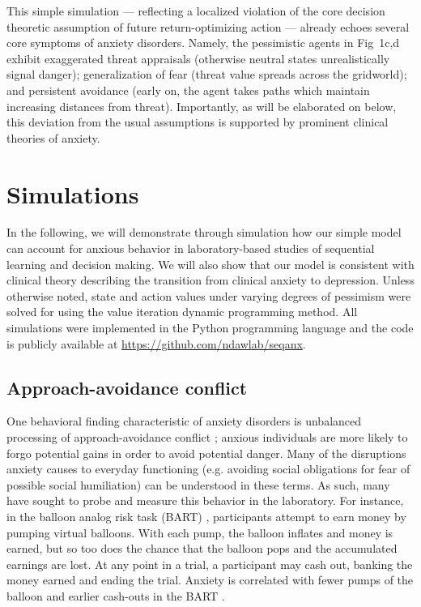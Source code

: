 \documentclass[11pt]{article} %
\begin{document}
This simple simulation --- reflecting a localized violation of the core decision theoretic assumption of future return-optimizing action --- already echoes several core symptoms of anxiety disorders. Namely, the pessimistic agents in Fig~1c,d exhibit exaggerated threat appraisals (otherwise neutral states unrealistically signal danger); generalization of fear (threat value spreads across the gridworld); and persistent avoidance (early on, the agent takes paths which maintain increasing distances from threat). Importantly, as will be elaborated on below, this deviation from the usual assumptions is supported by prominent clinical theories of anxiety.

\section{Simulations}

In the following, we will demonstrate through simulation how our simple model can account for anxious behavior in laboratory-based studies of sequential learning and decision making. We will also show that our model is consistent with clinical theory describing the transition from clinical anxiety to depression. Unless otherwise noted, state and action values under varying degrees of pessimism were solved for using the value iteration dynamic programming method\citep{SuttonBarto2018}. All simulations were implemented in the Python programming language and the code is publicly available at \url{https://github.com/ndawlab/seqanx}. 

\subsection{Approach-avoidance conflict}

One behavioral finding characteristic of anxiety disorders is unbalanced processing of approach-avoidance conflict \citep{aupperle2010}; anxious individuals are more likely to forgo potential gains in order to avoid potential danger. Many of the disruptions anxiety causes to everyday functioning (e.g. avoiding social obligations for fear of possible social humiliation) can be understood in these terms. As such, many have sought to probe and measure this behavior in the laboratory. For instance, in the balloon analog risk task (BART) \citep{Lejuez2002}, participants attempt to earn money by pumping virtual balloons. With each pump, the balloon inflates and money is earned, but so too does the chance that the balloon pops and the accumulated earnings are lost. At any point in a trial, a participant may cash out, banking the money earned and ending the trial. Anxiety is correlated with fewer pumps of the balloon and earlier cash-outs in the BART \citep{Maner2007, ramirez2015}.
\end{document}
